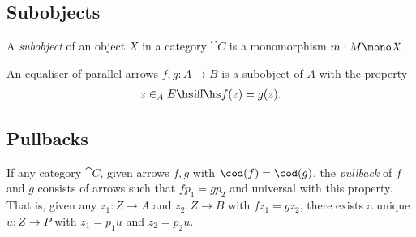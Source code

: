 \documentclass{article}
\begin{document}
\subsection{Subobjects}

\begin{definition}[Awodey p. 89]
    A \emph{subobject} of an object $X$ in a category $\cat C$ is
    a monomorphism $m:M\mono X$.
\end{definition}

\begin{corollary}
    An equaliser of parallel arrows $f,g:A\to B$ is a subobject
    of $A$ with the property
    \begin{align*}
        z\in_A E \hs\text{iff}\hs f(z) = g(z).
    \end{align*}
\end{corollary}

\subsection{Pullbacks}

\begin{definition}[Awodey p. 92]
    If any category $\cat C$, given arrows $f,g$ with $\cod(f)=\cod(g)$,
    the \emph{pullback} of $f$ and $g$ consists of arrows such that $fp_1=gp_2$
    and universal with this property. That is, given any $z_1:Z\to A$ and
    $z_2:Z\to B$ with $fz_1=gz_2$, there exists a unique $u:Z\to P$ with
    $z_1=p_1u$ and $z_2=p_2u$.
    \begin{center}
    \end{center}
\end{definition}
\end{document}
